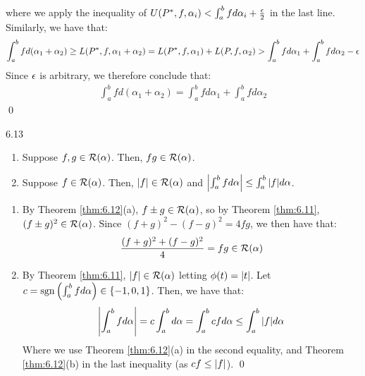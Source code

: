 \begin{nproof}
\begin{enumerate}
\begin{align*}
        \end{align*}
        where we apply the inequality of $U(P^*, f, \alpha_i) < \int_a^b f d\alpha_i + \frac{\epsilon}{2}$ in the last line. Similarly, we have that:
        \begin{align*}
            \int_a^b fd(\alpha_1 + \alpha_2) \geq L(P^*, f, \alpha_1 + \alpha_2) = L(P^*, f, \alpha_1) + L(P, f, \alpha_2) > \int_a^b fd\alpha_1 + \int_a^b fd\alpha_2 - \epsilon
        \end{align*}
        Since $\epsilon$ is arbitrary, we therefore conclude that:
        \begin{align*}
            \int_a^b f d(\alpha_1 + \alpha_2) = \int_a^b fd\alpha_1 + \int_a^b fd\alpha_2
        \end{align*} \qed
    \end{enumerate}
\end{nproof}

\begin{theorem}{}{6.13}
    \begin{enumerate}
        \item Suppose $f, g \in \mathcal{R}(\alpha)$. Then, $fg \in \mathcal{R}(\alpha)$.
        \item Suppose $f \in \mathcal{R}(\alpha)$. Then, $\abs{f} \in \mathcal{R}(\alpha)$ and $\abs{\int_a^b fd\alpha} \leq \int_a^b \abs{f}d\alpha$.
    \end{enumerate}
\end{theorem}
\begin{nproof}
    \begin{enumerate}
        \item By Theorem \ref{thm:6.12}(a), $f \pm g \in \mathcal{R}(\alpha)$, so by Theorem \ref{thm:6.11}, $(f \pm g)^2 \in \mathcal{R}(\alpha)$. Since $(f+g)^2 - (f-g)^2 = 4fg$, we then have that:
        \begin{align*}
            \frac{(f+g)^2 + (f-g)^2}{4} = fg \in \mathcal{R}(\alpha)
        \end{align*}
        \item By Theorem \ref{thm:6.11}, $\abs{f} \in \mathcal{R}(\alpha)$ letting $\phi(t) = \abs{t}$. Let $c = \operatorname{sgn}\left(\int_a^b f d\alpha\right) \in \set{-1, 0, 1}$. Then, we have that:
        \begin{align*}
            \abs{\int_a^b fd\alpha} = c\int_a^b d\alpha = \int_a^b cfd\alpha \leq \int_a^b \abs{f}d\alpha
        \end{align*}
        Where we use Theorem \ref{thm:6.12}(a) in the second equality, and Theorem \ref{thm:6.12}(b) in the last inequality (as $cf \leq \abs{f}$). \qed
    \end{enumerate}
\end{nproof}

